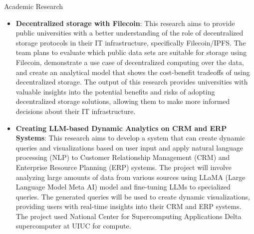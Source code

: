 \documentclass{resume} %
\begin{document}
	
	\begin{rSection}{Academic Research}
		\begin{itemize}
			\item \textbf{Decentralized storage with Filecoin}: This research aims to provide public universities with a better understanding of the role of decentralized storage protocols in their IT infrastructure, specifically Filecoin/IPFS. The team plans to evaluate which public data sets are suitable for storage using Filecoin, demonstrate a use case of decentralized computing over the data, and create an analytical model that shows the cost-benefit tradeoffs of using decentralized storage. The output of this research provides universities with valuable insights into the potential benefits and risks of adopting decentralized storage solutions, allowing them to make more informed decisions about their IT infrastructure.
			\item \textbf{Creating LLM-based Dynamic Analytics on CRM and ERP Systems}: This research aims to develop a system that can create dynamic queries and visualizations based on user input and apply natural language processing (NLP) to Customer
			Relationship Management (CRM) and Enterprise Resource Planning (ERP) systems. The project 
			will involve analyzing large amounts of data from various sources using LLaMA (Large 
			Language Model Meta AI) model and fine-tuning LLMs to specialized queries. The generated 
			queries will be used to create dynamic visualizations, providing users with real-time insights 
			into their CRM and ERP systems. The project used National Center for Supercomputing Applications Delta supercomputer at UIUC for compute.
		\end{itemize}
	\end{rSection}
	
	
	
	
\end{document}
